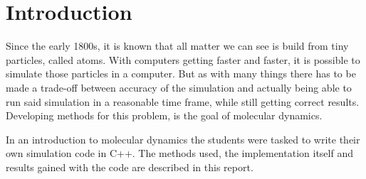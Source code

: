 \chapter{Introduction}
\begin{comment}
- atoms maybe as the first bullet point 1800 know but also the greeks knew, but was kinda forgotten again. Do i need a cite there?! nah
- with stronger computers it became possible to simulate  the atoms, but kinda computationally expensive, methods have to be developed to simplifyc  stuff
- mention like the goal of this, build an own smol simulation
- introduction to md simulation 
- weird mix between chemistry, physics and computation + a lot of programming
- written in c++ instead of the standard python stuff 
- from a developers perspective programming in python will most likely take less time, while programming in be a bit faster (and more complicated)
\end{comment}


Since the early 1800s, it is known that all matter we can see is build from tiny particles, called atoms. With computers getting faster and faster, it is possible to simulate those particles in a computer. But as with many things there has to be made a trade-off between accuracy of the simulation and actually being able to run said simulation in a reasonable time frame, while still getting correct results. 
Developing methods for this problem, is the goal of molecular dynamics. 
\par 
In an introduction to molecular dynamics the students were tasked to write their own simulation code in C++. The methods used, the implementation itself and results gained with the code are described in this report. 